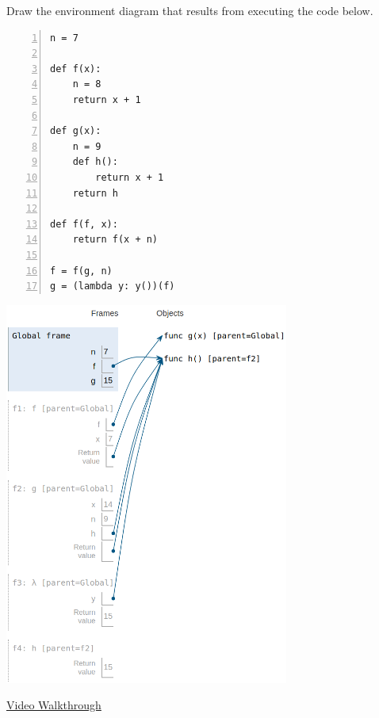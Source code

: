 \question Draw the environment diagram that results from executing the
code below.

\begin{minipage}{\textwidth}
\begin{lstlisting}[numbers=left, numberfirstline=false]
n = 7

def f(x):
    n = 8
    return x + 1

def g(x):
    n = 9
    def h():
        return x + 1
    return h

def f(f, x):
    return f(x + n)

f = f(g, n)
g = (lambda y: y())(f)
\end{lstlisting}
\end{minipage}

\begin{solution}[0.5in]
\begin{center}
\includegraphics[width=0.7\textwidth]{fgh.png}
\end{center}
\href{https://www.youtube.com/watch?v=wBQNAJnBDvA}{Video Walkthrough}
\end{solution}
